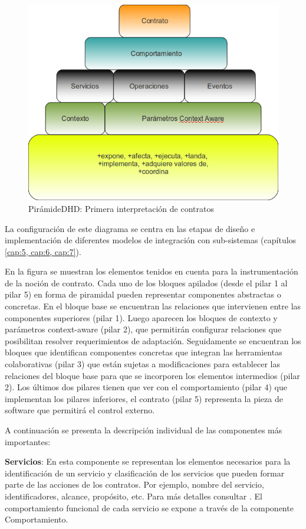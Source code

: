 \begin{figure}[h]
\begin{center}
 \includegraphics[width=4 in,totalheight=3 in] {Ch0/contratosv1}
\caption{PirámideDHD: Primera interpretación de contratos}
\label{fig:contratosv1}
\end{center}
\end{figure}


La configuración de este diagrama se centra en las etapas de diseño e
implementación de diferentes modelos de integración con sub-sistemas
(capítulos \ref{cap:5, cap:6, cap:7}). 


En la figura se muestran los elementos tenidos en cuenta
para la instrumentación de la noción de contrato. Cada uno de los bloques
apilados (desde el pilar 1 al pilar 5) en forma de piramidal pueden representar
componentes abstractas o concretas. En el bloque base se encuentran las
relaciones que  intervienen entre las componentes superiores (pilar 1). Luego
aparecen los bloques de contexto y parámetros context-aware (pilar 2), que
permitirán configurar relaciones que posibilitan resolver requerimientos de
adaptación. Seguidamente se encuentran los bloques que identifican componentes concretas que
integran las herramientas colaborativas (pilar 3) que están sujetas a
modificaciones para establecer las relaciones del bloque base para que se incorporen los
elementos intermedios (pilar 2). Los últimos dos pilares tienen que ver con el
comportamiento (pilar 4) que implementan los pilares inferiores, el contrato
(pilar 5) representa la pieza de software que permitirá el control externo. 

A continuación se presenta la descripción individual de las componentes más importantes:

\textbf{Servicios}: En esta componente se representan los elementos necesarios
para la identificación de un servicio y clasificación de los servicios que
pueden formar parte de las acciones de los contratos. Por ejemplo, nombre del
servicio, identificadores, alcance, propósito, etc. Para más detalles
consultar \cite{cap1.5}. El comportamiento funcional de cada servicio se
expone a través de la componente Comportamiento.

